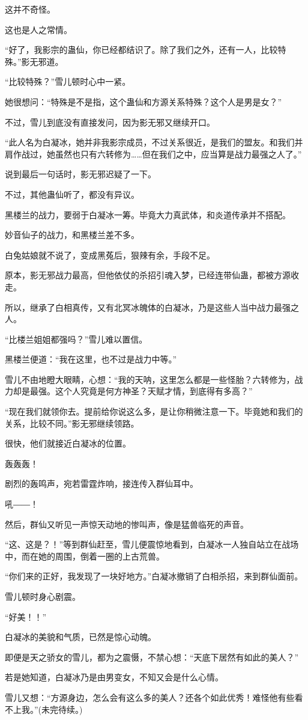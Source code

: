 \begin{this_body}
这并不奇怪。

这也是人之常情。

“好了，我影宗的蛊仙，你已经都结识了。除了我们之外，还有一人，比较特殊。”影无邪道。

“比较特殊？”雪儿顿时心中一紧。

她很想问：“特殊是不是指，这个蛊仙和方源关系特殊？这个人是男是女？”

不过，雪儿到底没有直接发问，因为影无邪又继续开口。

“此人名为白凝冰，她并非我影宗成员，不过关系很近，是我们的盟友。和我们并肩作战过，她虽然也只有六转修为……但在我们之中，应当算是战力最强之人了。”

说到最后一句话时，影无邪迟疑了一下。

不过，其他蛊仙听了，都没有异议。

黑楼兰的战力，要弱于白凝冰一筹。毕竟大力真武体，和炎道传承并不搭配。

妙音仙子的战力，和黑楼兰差不多。

白兔姑娘就不说了，变成黑菟后，狠辣有余，手段不足。

原本，影无邪战力最高，但他依仗的杀招引魂入梦，已经连带仙蛊，都被方源收走。

所以，继承了白相真传，又有北冥冰魄体的白凝冰，乃是这些人当中战力最强之人。

“比楼兰姐姐都强吗？”雪儿难以置信。

黑楼兰便道：“我在这里，也不过是战力中等。”

雪儿不由地瞪大眼睛，心想：“我的天呐，这里怎么都是一些怪胎？六转修为，战力却是最强。这个人究竟是何方神圣？天赋才情，到底得有多高？”

“现在我们就领你去。提前给你说这么多，是让你稍微注意一下。毕竟她和我们的关系，比较不同。”影无邪继续领路。

很快，他们就接近白凝冰的位置。

轰轰轰！

剧烈的轰鸣声，宛若雷霆炸响，接连传入群仙耳中。

吼――！

然后，群仙又听见一声惊天动地的惨叫声，像是猛兽临死的声音。

“这、这是？！”等到群仙赶至，雪儿便震惊地看到，白凝冰一人独自站立在战场中，而在她的周围，倒着一圈的上古荒兽。

“你们来的正好，我发现了一块好地方。”白凝冰撤销了白相杀招，来到群仙面前。

雪儿顿时身心剧震。

“好美！！”

白凝冰的美貌和气质，已然是惊心动魄。

即便是天之骄女的雪儿，都为之震慑，不禁心想：“天底下居然有如此的美人？”

若是她知道，白凝冰乃是由男变女，不知又会是什么心情。

雪儿又想：“方源身边，怎么会有这么多的美人？还各个如此优秀！难怪他有些看不上我。”(未完待续。)

\end{this_body}

